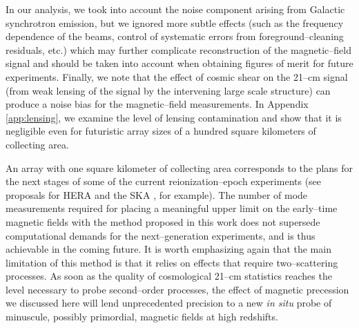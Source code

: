 In our analysis, we took into account the noise component arising from Galactic synchrotron emission, but we ignored more subtle effects (such as the frequency dependence of the beams, control of systematic errors from foreground--cleaning residuals, etc.) which may further complicate reconstruction of the magnetic--field signal and should be taken into account when obtaining figures of merit for future experiments.
Finally, we note that the effect of cosmic shear on the 21--cm signal (from weak lensing of the signal by the intervening large scale structure) can produce a noise bias for the magnetic--field measurements. In Appendix \ref{app:lensing}, we examine the level of lensing contamination and show that it is negligible even for futuristic array sizes of a hundred square kilometers of collecting area. 

An array with one square kilometer of collecting area corresponds to the plans for the next stages of some of the current reionization--epoch experiments (see proposals for HERA \cite{2015AAS...22532803D} and the SKA \cite{2008arXiv0802.1727C}, for example). The number of mode measurements required for placing a meaningful upper limit on the early--time magnetic fields with the method proposed in this work does not supersede computational demands for the next--generation  experiments, and is thus achievable in the coming future. It is worth emphasizing again that the main limitation of this method is that it relies on effects that require two--scattering processes. As soon as the quality of cosmological 21--cm statistics reaches the level necessary to probe second--order processes, the effect of magnetic precession we discussed here will lend unprecedented precision to a new \textit{in situ} probe of minuscule, possibly primordial, magnetic fields at high redshifts. 

  